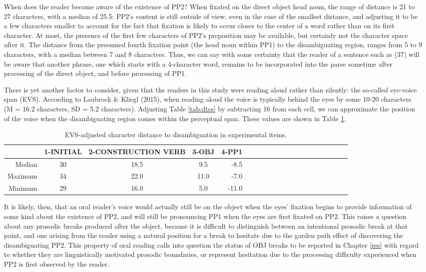 \documentclass[11pt,oneside]{book}
\begin{document}
When does the reader become aware of the existence of PP2? When fixated on the direct object head noun, the range of distance is 21 to 27 characters, with a median of 25.5: PP2's content is still outside of view, even in the case of the smallest distance, and adjusting it to be a few characters smaller to account for the fact that fixation is likely to occur closer to the center of a word rather than on its first character. At most, the presence of the first few characters of PP2's preposition may be available, but certainly not the character space after it. The distance from the presumed fourth fixation point (the head noun within PP1) to the disambiguating region, ranges from 5 to 9 characters, with a median between 7 and 8 characters. Thus, we can say with some certainty that the reader of a sentence such as (37) will be aware that another phrase, one which starts with a 4-character word, remains to be incorporated into the parse sometime after processing of the direct object, and before processing of PP1.

There is yet another factor to consider, given that the readers in this study were reading aloud rather than silently: the so-called eye-voice span (EVS). According to Laubrock \& Kliegl (2015), when reading aloud the voice is typically behind the eyes by some 10-20 characters (M = 16.2 characters, SD = 5.2 characters). Adjusting Table \ref{tab:dtcs} by subtracting 16 from each cell, we can approximate the position of the voice when the disambiguating region comes within the perceptual span. These values are shown in Table \ref{tab:evsdtcr}.

\begin{table}[!h]

\caption{\label{tab:evsdtcr}EVS-adjusted character distance to disambiguation in experimental items.}
\centering
\begin{tabular}{rcccrcccrcccrcccrccc}
\toprule
  & 1-INITIAL & 2-CONSTRUCTION VERB & 3-OBJ & 4-PP1\\
\midrule
Median & 30 & 18.5 & 9.5 & -8.5\\
Maximum & 34 & 22.0 & 11.0 & -7.0\\
Minimum & 29 & 16.0 & 5.0 & -11.0\\
\bottomrule
\end{tabular}
\end{table}

It is likely, then, that an oral reader's voice would actually still be on the object when the eyes' fixation begins to provide information of some kind about the existence of PP2, and will still be pronouncing PP1 when the eyes are first fixated on PP2. This raises a question about any prosodic breaks produced after the object, because it is difficult to distinguish between an intentional prosodic break at that point, and one arising from the reader using a natural position for a break to hesitate due to the garden path effect of discovering the disambiguating PP2. This property of oral reading calls into question the status of OBJ breaks to be reported in Chapter \ref{res} with regard to whether they are linguistically motivated prosodic boundaries, or represent hesitation due to the processing difficulty experienced when PP2 is first observed by the reader.
\end{document}
